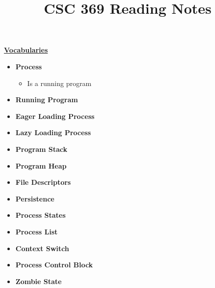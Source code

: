 \documentclass[12pt]{article}
\begin{document}
\title{CSC 369 Reading Notes}

\begin{mdframed}
\underline{\textbf{Vocabularies}}

\bigskip

\begin{itemize}
    \item \textbf{Process}
    \begin{itemize}
        \item Is a running program
    \end{itemize}
    \item \textbf{Running Program}
    \item \textbf{Eager Loading Process}
    \item \textbf{Lazy Loading Process}
    \item \textbf{Program Stack}
    \item \textbf{Program Heap}
    \item \textbf{File Descriptors}
    \item \textbf{Persistence}
    \item \textbf{Process States}
    \item \textbf{Process List}
    \item \textbf{Context Switch}
    \item \textbf{Process Control Block}
    \item \textbf{Zombie State}
\end{itemize}

\end{mdframed}
\end{document}
